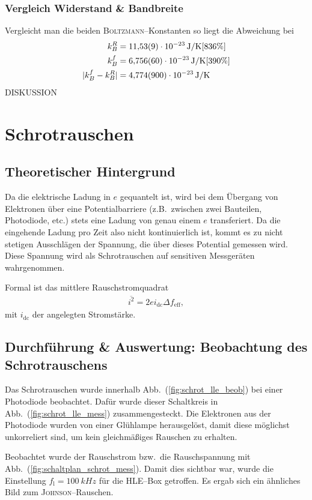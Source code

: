 \documentclass[sn-mathphys-num,iicol]{sn-jnl}
\theoremstyle{thmstyleone}
\theoremstyle{thmstyletwo}
\theoremstyle{thmstylethree}
\begin{document}
\subsubsection{Vergleich Widerstand \& Bandbreite}
Vergleicht man die beiden \textsc{Boltzmann}--Konstanten so liegt die Abweichung bei
\begin{align} 
        k_B^R&=\SI{11.53+-0.09e-23}{J/K}[836\%]\\
        k_B^f&=\SI{6.756+-0.06e-23}{J/K}[390\%]\\
        |k_B^f-k_B^R|&=\SI{4.774+-0.90e-23}{J/K}
\end{align} 
DISKUSSION


\section{Schrotrauschen}
\subsection{Theoretischer Hintergrund}
Da die elektrische Ladung in $e$ gequantelt ist, wird bei dem Übergang von Elektronen über eine Potentialbarriere (z.B.\ zwischen zwei Bauteilen, Photodiode, etc.) stets eine Ladung von genau einem $e$ transferiert.
Da die eingehende Ladung pro Zeit also nicht kontinuierlich ist, kommt es zu nicht stetigen Ausschlägen der Spannung, die über dieses Potential gemessen wird.
Diese Spannung wird als Schrotrauschen auf sensitiven Messgeräten wahrgenommen.

Formal ist das mittlere Rauschstromquadrat
\begin{align} 
        \overline{i^2}=2ei_\text{dc}\Delta f_\text{eff}
,\end{align} 
mit $i_\text{dc}$ der angelegten Stromstärke. 

\subsection{Durchführung \& Auswertung: Beobachtung des Schrotrauschens}
Das Schrotrauschen wurde innerhalb Abb.\ (\ref{fig:schrot_lle_beob}) bei einer Photodiode beobachtet. 
Dafür wurde dieser Schaltkreis in Abb.\ (\ref{fig:schrot_lle_mess}) zusammengesteckt.
Die Elektronen aus der Photodiode wurden von einer Glühlampe herausgelöst, damit diese möglichst unkorreliert sind, um kein gleichmäßiges Rauschen zu erhalten. 

Beobachtet wurde der Rauschstrom bzw.\ die Rauschspannung mit Abb.\ (\ref{fig:schaltplan_schrot_mess}).
Damit dies sichtbar war, wurde die Einstellung $f_\text{l}=\SI{100}{kHz}$ für die HLE--Box getroffen.
Es ergab sich ein ähnliches Bild zum \textsc{Johnson}--Rauschen. %
\end{document}
